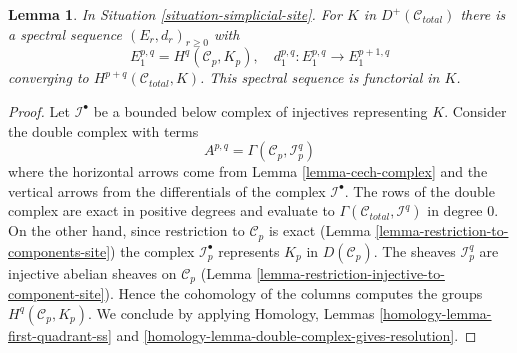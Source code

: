 \documentclass{stacks-project}
\theoremstyle{plain}
\newtheorem{lemma}[subsection]{Lemma}
\theoremstyle{definition}
\theoremstyle{remark}
\numberwithin{equation}{subsection}
\begin{document}
\begin{lemma}
\label{lemma-simplicial-sheaf-cohomology-site}
In Situation \ref{situation-simplicial-site}. For $K$ in
$D^+(\mathcal{C}_{total})$ there is a spectral sequence
$(E_r, d_r)_{r \geq 0}$ with
$$
E_1^{p, q} = H^q(\mathcal{C}_p, K_p),\quad
d_1^{p, q} : E_1^{p, q} \to E_1^{p + 1, q}
$$
converging to $H^{p + q}(\mathcal{C}_{total}, K)$.
This spectral sequence is functorial in $K$.
\end{lemma}

\begin{proof}
Let $\mathcal{I}^\bullet$ be a bounded below complex of injectives
representing $K$. Consider the double complex with terms
$$
A^{p, q} = \Gamma(\mathcal{C}_p, \mathcal{I}^q_p)
$$
where the horizontal arrows come from Lemma \ref{lemma-cech-complex}
and the vertical arrows from the differentials of the
complex $\mathcal{I}^\bullet$. The rows of the double complex are exact
in positive degrees and evaluate to
$\Gamma(\mathcal{C}_{total}, \mathcal{I}^q)$ in degree $0$.
On the other hand, since restriction to $\mathcal{C}_p$ is exact
(Lemma \ref{lemma-restriction-to-components-site})
the complex $\mathcal{I}_p^\bullet$ represents $K_p$ in
$D(\mathcal{C}_p)$. The sheaves $\mathcal{I}_p^q$ are injective
abelian sheaves on $\mathcal{C}_p$
(Lemma \ref{lemma-restriction-injective-to-component-site}).
Hence the cohomology of the columns computes the groups
$H^q(\mathcal{C}_p, K_p)$. We conclude by applying
Homology, Lemmas \ref{homology-lemma-first-quadrant-ss} and
\ref{homology-lemma-double-complex-gives-resolution}.
\end{proof}
\end{document}
